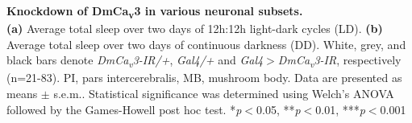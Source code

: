 \label{fig:S5}
\textbf{Knockdown of DmCa\textsubscript{v}3 in various neuronal subsets.}
\\
\textbf {(a)} Average total sleep over two days of 12h:12h light-dark cycles (LD).
\textbf {(b)} Average total sleep over two days of continuous darkness (DD).
White, grey, and black bars denote \emph{DmCa\textsubscript{v}3-IR/+}, \emph{Gal4/+} and \emph{Gal4$>$DmCa\textsubscript{v}3-IR}, respectively (n=21-83).
PI, pars intercerebralis, MB, mushroom body. 
Data are presented as means $\pm$ s.e.m..
Statistical significance was determined using Welch's ANOVA followed by the Games-Howell post hoc test.
*\emph{p}$<$0.05, **\emph{p}$<$0.01, ***\emph{p}$<$0.001